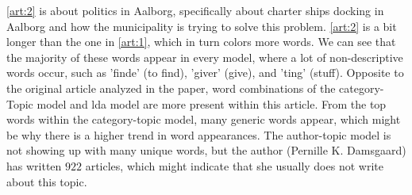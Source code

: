 \autoref{art:2} is about politics in Aalborg, specifically about charter ships docking in Aalborg and how the municipality is trying to solve this problem.
\autoref{art:2} is a bit longer than the one in \autoref{art:1}, which in turn colors more words.
We can see that the majority of these words appear in every model, where a lot of non-descriptive words occur, such as 'finde' (to find), 'giver' (give), and 'ting' (stuff). 
Opposite to the original article analyzed in the paper, word combinations of the category-Topic model and \gls{lda} model are more present within this article.
From the top words within the category-topic model, many generic words appear, which might be why there is a higher trend in word appearances.
The author-topic model is not showing up with many unique words, but the author (Pernille K. Damsgaard) has written $922$ articles, which might indicate that she usually does not write about this topic.
\\
